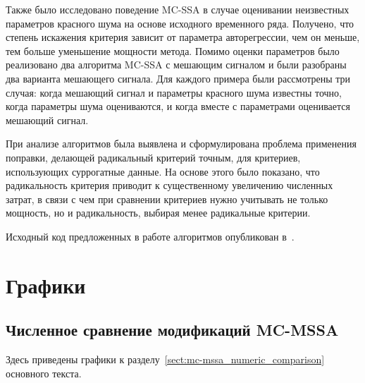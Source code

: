 \documentclass[specialist,
substylefile = spbu.rtx,
               subf,href,colorlinks=true,12pt]{disser}
\theoremstyle{definition}
\begin{document}
Также было исследовано поведение MC-SSA в случае оценивании неизвестных параметров красного шума на основе исходного временного ряда. Получено, что степень искажения критерия зависит от параметра авторегрессии, чем он меньше, тем больше уменьшение мощности метода. Помимо оценки параметров было реализовано два алгоритма MC-SSA с мешающим сигналом и были разобраны два варианта мешающего сигнала. Для каждого примера были рассмотрены три случая: когда мешающий сигнал и параметры красного шума известны точно, когда параметры шума оцениваются, и когда вместе с параметрами оценивается мешающий сигнал.

При анализе алгоритмов была выявлена и сформулирована проблема применения поправки, делающей радикальный критерий точным, для критериев, использующих суррогатные данные. На основе этого было показано, что радикальность критерия приводит к существенному увеличению численных затрат, в связи с чем при сравнении критериев нужно учитывать не только мощность, но и радикальность, выбирая менее радикальные критерии.

Исходный код предложенных в работе алгоритмов опубликован в~\cite{Poteshkin_2024}.




\appendix

\chapter{Графики}
\section{Численное сравнение модификаций MC-MSSA}\label{appendix:mc-mssa_graphs}
Здесь приведены графики к разделу~\ref{sect:mc-mssa_numeric_comparison} основного текста.
\end{document}
